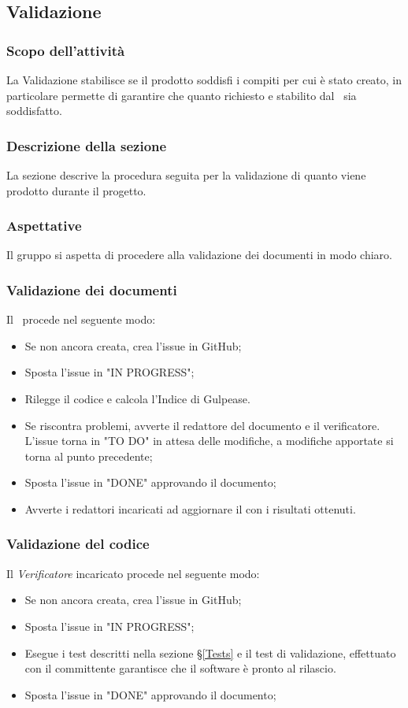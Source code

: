\subsection{Validazione}\label{PSup_Validazione}
\subsubsection{Scopo dell'attività} 
La Validazione stabilisce se il prodotto soddisfi i compiti per cui è stato creato, in particolare permette di garantire che quanto richiesto e stabilito dal \Proponente\ sia soddisfatto.
\subsubsection{Descrizione della sezione} 
La sezione descrive la procedura seguita per la validazione di quanto viene prodotto durante il progetto.
\subsubsection{Aspettative}
Il gruppo si aspetta di procedere alla validazione dei documenti in modo chiaro. 

\subsubsection{Validazione dei documenti}
Il \Responsabile\ procede nel seguente modo:
\begin{itemize}
	\item Se non ancora creata, crea l'issue in GitHub;
	\item Sposta l'issue in "IN PROGRESS";
	\item Rilegge il codice e calcola l'Indice di Gulpease.
	\item Se riscontra problemi, avverte il redattore del documento e il verificatore. L'issue torna in "TO DO" in attesa delle modifiche, a modifiche apportate si torna al punto precedente;
	\item Sposta l'issue in "DONE" approvando il documento;
	\item Avverte i redattori incaricati ad aggiornare il \PdQv{} con i risultati ottenuti.
\end{itemize}

\subsubsection{Validazione del codice}
Il \textit{Verificatore} incaricato procede nel seguente modo:
\begin{itemize}
	\item Se non ancora creata, crea l'issue in GitHub;
	\item Sposta l'issue in "IN PROGRESS";
	\item Esegue i test descritti nella sezione \S\ref{Tests} e il test di validazione, effettuato con il committente garantisce che il software è pronto al rilascio.
	\item Sposta l'issue in "DONE" approvando il documento;
\end{itemize}

